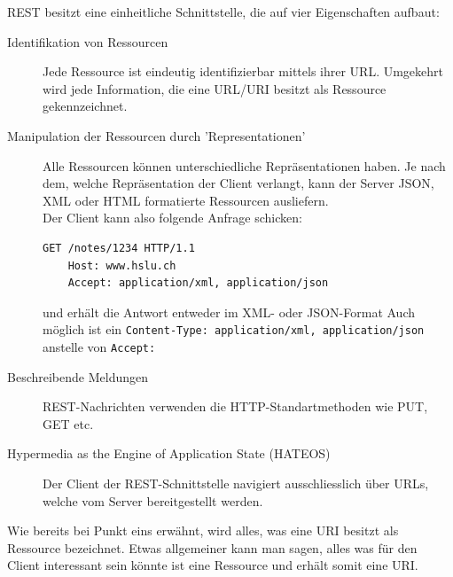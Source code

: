 \documentclass[a4paper, 11pt]{article}
\newcommand{\code}[1]{\texttt{#1}}
\begin{document}
\noindent REST besitzt eine einheitliche Schnittstelle, die auf vier Eigenschaften aufbaut:

\begin{description}
	\item[Identifikation von Ressourcen ] Jede Ressource ist eindeutig identifizierbar mittels ihrer URL. Umgekehrt wird jede Information, die eine URL/URI besitzt als Ressource gekennzeichnet.
	\item[Manipulation der Ressourcen durch 'Representationen' ] Alle Ressourcen können unterschiedliche Repräsentationen haben. Je nach dem, welche Repräsentation der Client verlangt, kann der Server JSON, XML oder HTML formatierte Ressourcen ausliefern. \\
	Der Client kann also folgende Anfrage schicken:
	\begin{lstlisting}[language=html]
	GET /notes/1234 HTTP/1.1 
	Host: www.hslu.ch
	Accept: application/xml, application/json
	\end{lstlisting}
	und erhält die Antwort entweder im XML- oder JSON-Format
	Auch möglich ist ein \code{Content-Type: application/xml, application/json} anstelle von \code{Accept: } 
	\item[Beschreibende Meldungen ] REST-Nachrichten verwenden die HTTP-Standartmethoden wie PUT, GET etc. 
	\item[Hypermedia as the Engine of Application State (HATEOS)] Der Client der REST-Schnittstelle navigiert ausschliesslich über URLs, welche vom Server bereitgestellt werden.
\end{description}
\vspace{10px}

\noindent Wie bereits bei Punkt eins erwähnt, wird alles, was eine URI besitzt als Ressource bezeichnet. Etwas allgemeiner kann man sagen, alles was für den Client interessant sein könnte ist eine Ressource und erhält somit eine URI.
\vspace{10px}
\end{document}
